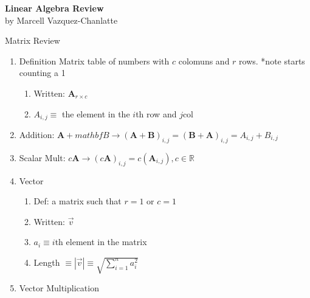 \documentclass[12pt]{article}
\newcommand{\abs}[1]{\left| #1 \right|} %
\renewcommand{\=}[1]{\stackrel{#1}{=}} %
\theoremstyle{definition}
\theoremstyle{remark}
\begin{document}
\begin{center}
  {\LARGE
    \textbf{Linear Algebra Review}\\
    \normalsize
    \textnormal {by Marcell Vazquez-Chanlatte}
    \\[1ex]}

\end{center}

Matrix Review
\begin{enumerate}
\item Definition Matrix table of numbers with $c$ colomuns and $r$
  rows. *note starts counting a 1
  \begin{enumerate}
  \item Written: $\mathbf{A}_{r\times c}$
  \item $A_{i,j} \equiv$ the element in the $i$th row and $j$col
  \end{enumerate}
\item Addition: 
  $\mathbf{A} + mathbf{B} \rightarrow (\mathbf{A}+\mathbf{B})_{i,j} =  (\mathbf{B} + \mathbf{A})_{i,j} =A_{i,j} + B_{i,j}$
\item Scalar Mult: $c\mathbf{A} \rightarrow (c\mathbf{A})_{i,j} =
  c(\mathbf{A}_{i,j}), c\in \mathbb{R}$
\item Vector
  \begin{enumerate}
  \item Def: a matrix such that $r=1$ or $c=1$
  \item Written: $\vec{v}$
  \item $a_{i} \equiv i$th element in the matrix
  \item Length $\equiv \abs{\vec{v}} \equiv \sqrt{\sum_{i=1}^n a_i^2}$
  \end{enumerate}
\item Vector Multiplication
  \begin{enumerate}
  \item Dot Product: $\vec{a}\cdot \vec{b} \equiv
    \sum_{i=1}^{n}a_i+b_i$, $a,b\in \mathbb{R}^n \equiv \abs{a}\abs{b}\cos(\theta}}$
  \item Cross Product: 
  \end{enumerate}
\end{enumerate}
\end{document}
